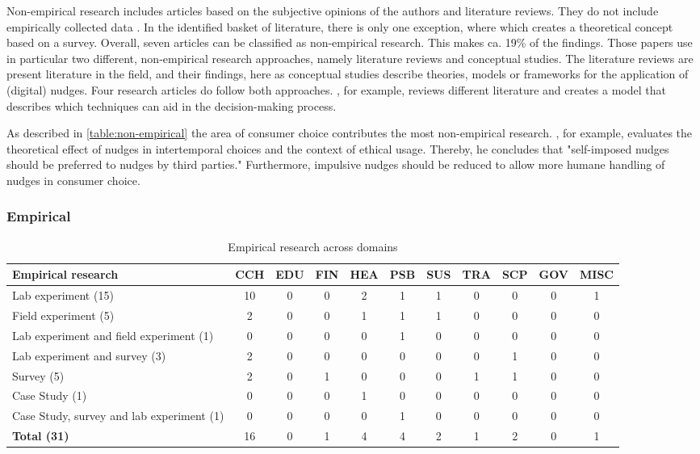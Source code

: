 Non-empirical research includes articles based on the subjective opinions of the authors and literature reviews. They do not include empirically collected data \cite{alavi_review_1992}. In the identified basket of literature, there is only one exception, where \cite{gamliel_average_2017} which creates a theoretical concept based on a survey. Overall, seven articles can be classified as non-empirical research. This makes ca. 19\% of the findings. Those papers use in particular two different, non-empirical research approaches, namely literature reviews and conceptual studies. The literature reviews are present literature in the field, and their findings, here as conceptual studies describe theories, models or frameworks for the application of (digital) nudges. Four research articles do follow both approaches. \cite{broniarczyk_decision_2014}, for example, reviews different literature and creates a model that describes which techniques can aid in the decision-making process.

As described in  \ref{table:non-empirical} the area of consumer choice contributes the most non-empirical research. \cite{lades_impulsive_2014}, for example, evaluates the theoretical effect of nudges in intertemporal choices and the context of ethical usage. Thereby, he concludes that "self-imposed nudges should be preferred to nudges by third parties." Furthermore, impulsive nudges should be reduced to allow more humane handling of nudges in consumer choice.


\subsubsection{Empirical}
\begin{table}[htbp]
\small
\centering
\begin{tabular}{p{3.6cm}|cccccccccc}
\textbf{Empirical research} & \textbf{CCH} & \textbf{EDU} & \textbf{FIN} & \textbf{HEA} & \textbf{PSB} & \textbf{SUS} & \textbf{TRA} & \textbf{SCP} & \textbf{GOV} & \textbf{MISC} \\ \hline
Lab experiment (15) & 10 & 0 & 0 & 2 & 1 & 1 & 0 & 0 & 0 & 1 \\
Field experiment (5) & 2 & 0 & 0 & 1 & 1 & 1 & 0 & 0 & 0 & 0 \\
Lab experiment and field experiment (1) & 0 & 0 & 0 & 0 & 1 & 0 & 0 & 0 & 0 & 0 \\
Lab experiment and survey (3) & 2 & 0 & 0 & 0 & 0 & 0 & 0 & 1 & 0 & 0 \\
Survey (5) & 2 & 0 & 1 & 0 & 0 & 0 & 1 & 1 & 0 & 0 \\
Case Study (1) & 0 & 0 & 0 & 1 & 0 & 0 & 0 & 0 & 0 & 0 \\
Case Study, survey and lab experiment (1) & 0 & 0 & 0 & 0 & 1 & 0 & 0 & 0 & 0 & 0 \\ \hline
\textbf{Total (31)} & 16 & 0 & 1 & 4 & 4 & 2 & 1 & 2 & 0 & 1
\end{tabular}
\caption{Empirical research across domains}
\label{table:empirical}
\end{table}


